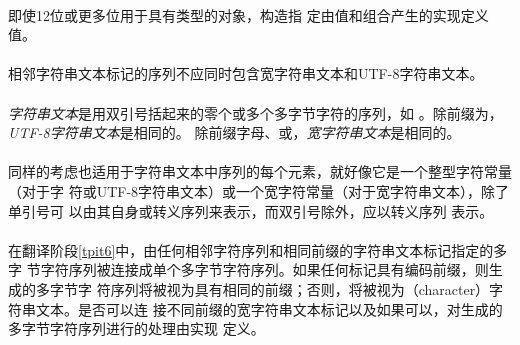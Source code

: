 {\paragraph{}
\ex 即使12位或更多位用于具有类型的对象，构造指
定由值和\tm{\sq 4\sq}组合产生的实现定义值。


\syntax
\paragraph{}

\constraint
\paragraph{}
相邻字符串文本标记的序列不应同时包含宽字符串文本和UTF-8字符串文本。

\desc
\paragraph{}
\textit{字符串文本}是用双引号括起来的零个或多个多字节字符的序列，如
。除前缀为，\textit{UTF-8字符串文本}是相同的。
除前缀字母、或，\textit{宽字符串文本}是相同的。

\paragraph{}
同样的考虑也适用于字符串文本中序列的每个元素，就好像它是一个整型字符常量（对于字
符或UTF-8字符串文本）或一个宽字符常量（对于宽字符串文本），除了单引号\tm{\sq}可
以由其自身或转义序列\tm{\bs\sq}来表示，而双引号\tm{\dq}除外，应以转义序列
\tm{\bs\dq}表示。

\semantic
\paragraph{}
在翻译阶段\ref{tpit6}中，由任何相邻字符序列和相同前缀的字符串文本标记指定的多字
节字符序列被连接成单个多字节字符序列。如果任何标记具有编码前缀，则生成的多字节字
符序列将被视为具有相同的前缀；否则，将被视为（character）字符串文本。是否可以连
接不同前缀的宽字符串文本标记以及如果可以，对生成的多字节字符序列进行的处理由实现
定义。

}
